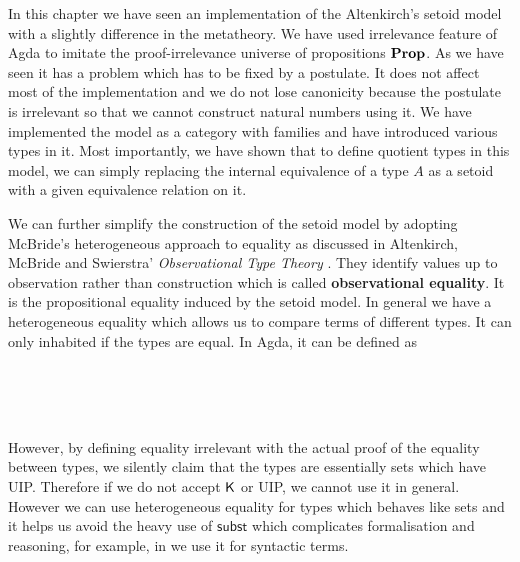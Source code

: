 In this chapter we have seen an implementation of the Altenkirch's setoid model with a slightly difference in the metatheory. We have used irrelevance feature of Agda to imitate the proof-irrelevance universe of propositions $\operatorname{\mathbf{Prop}}$. As we have seen it has a problem which has to be fixed by a postulate. It does not affect most of the implementation and we do not lose canonicity because the postulate is irrelevant so that we cannot construct natural numbers using it. We have implemented the model as a category with families and have introduced various types in it. Most importantly, we have shown that to define quotient types in this model, we can simply replacing the internal equivalence of a type $A$ as a setoid with a given equivalence relation on it. 

We can further simplify the construction of the setoid model by adopting McBride's heterogeneous approach to equality as discussed in Altenkirch, McBride and Swierstra' \emph{Observational Type Theory} \cite{alti:ott-conf}. They identify values up to observation rather than construction which is called \textbf{observational equality}. It is the propositional equality induced by the setoid model.  In general we have a heterogeneous equality which allows us to compare terms of different types. It can only inhabited if the types are equal. In Agda, it can be defined as

\begin{code}
\\
\>  \AgdaSymbol{\{} \AgdaSymbol{:} \AgdaSymbol{\}} \AgdaSymbol{(} \AgdaSymbol{:} \AgdaSymbol{)} \AgdaSymbol{:}  \AgdaSymbol{:} \AgdaSymbol{\}}     \<%
\\
\>[0]\<[2]%
\>[2] \AgdaSymbol{:}   \<%
\\
\end{code}


However, by defining equality irrelevant with the actual proof of the equality between types, we silently claim that the types are essentially sets which have UIP. Therefore if we do not accept $\operatorname{\mathsf{K}}$ or UIP, we cannot use it in general. However we can use heterogeneous equality for types which behaves like sets and it helps us avoid the heavy use of $\mathsf{subst}$ which complicates formalisation and reasoning, for example, in  we use it for syntactic terms.








